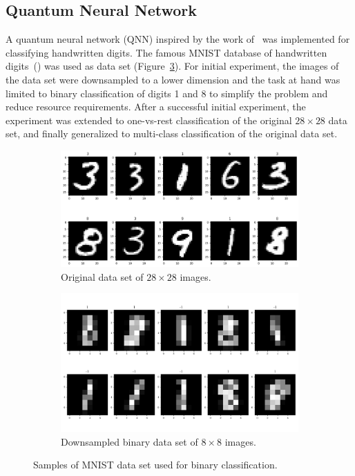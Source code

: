\documentclass[a4paper,10pt]{article}
\begin{document}
\subsection{Quantum Neural Network}
A quantum neural network (QNN) inspired by the work of~\cite{qnn-near-term} was implemented for classifying handwritten digits.
The famous MNIST database of handwritten digits~(\cite{mnist-digits}) was used as data set (Figure~\ref{fig:mnist}).
For initial experiment, the images of the data set were downsampled to a lower dimension and the task at hand was limited to binary classification of digits 1 and 8 to simplify the problem and reduce resource requirements.
After a successful initial experiment, the experiment was extended to one-vs-rest classification of the original $28 \times 28$ data set, and finally generalized to multi-class classification of the original data set.
\begin{figure}[ht]
	\centering
	\begin{subfigure}{.5\textwidth}
		\centering
		\includegraphics[width=.925\linewidth]{figures/mnist_28x28.png}
		\caption{Original data set of $28 \times 28$ images.}
		\label{fig:mnist_28x28}
	\end{subfigure}%
	\begin{subfigure}{.5\textwidth}
		\centering
		\includegraphics[width=.925\linewidth]{figures/mnist_8x8}
		\caption{Downsampled binary data set of $8 \times 8$ images.}
		\label{fig:mnist_8x8}
	\end{subfigure}
	\caption{Samples of MNIST data set used for binary classification.}
	\label{fig:mnist}
\end{figure}
\end{document}
